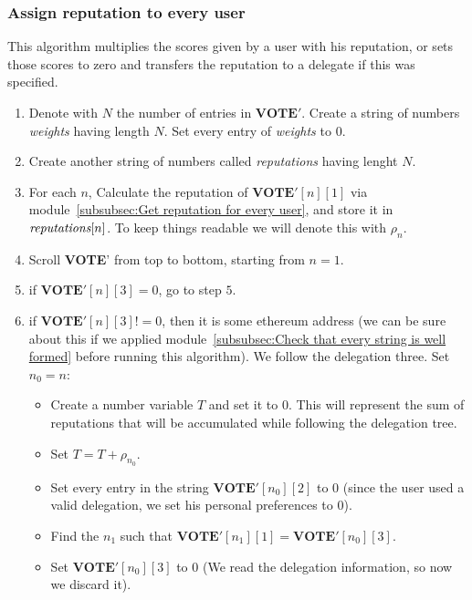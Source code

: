 \documentclass[submission, copyright,creativecommons,sharealike,noncommercial]{eptcs}
\newcommand{\Vote}{\textbf{VOTE}\xspace}
\begin{document}
\subsubsection{Assign reputation to every user}\label{subsubsec:Assign reputation to every user}
	This algorithm multiplies the scores given by a user with his reputation, or sets those scores to zero and transfers the reputation to a delegate if this was specified.
	\begin{enumerate}
		\item Denote with $N$ the number of entries in $\Vote'$. Create a string of numbers \emph{weights} having length $N$. Set every entry of \emph{weights} to $0$. 
		
		\item Create another string of numbers called \emph{reputations} having lenght $N$.
		
		\item For each $n$, Calculate the reputation of $\Vote'[n][1]$ via module~\ref{subsubsec:Get reputation for every user}, and store it in $\emph{reputations}[n]$. To keep things readable we will denote this with $\rho_{n}$.
		
		
		\item Scroll \Vote' from top to bottom, starting from $n=1$.
	
		\item if $\Vote'[n][3]=0$, go to step $5$.
	
		\item if $\Vote'[n][3]!=0$, then it is some ethereum address (we can be sure about this if we applied module~\ref{subsubsec:Check that every string is well formed} before running this algorithm). We follow the delegation three. Set $n_0=n$:
		\begin{itemize}
			\item Create a number variable $T$ and set it to $0$. This will represent the sum of reputations that will be accumulated while following the delegation tree.

			\item Set $T = T + \rho_{n_0}$. 
		
			\item Set every entry in the string $\Vote'[n_0][2]$ to $0$ (since the user used a valid delegation, we set his personal preferences to $0$).
			
			\item Find the $n_1$ such that $\Vote'[n_1][1] = \Vote'[n_0][3]$.
			
			\item Set $\Vote'[n_0][3]$ to $0$ (We read the delegation information, so now we discard it).
			

\end{itemize}
\end{enumerate}
\end{document}
